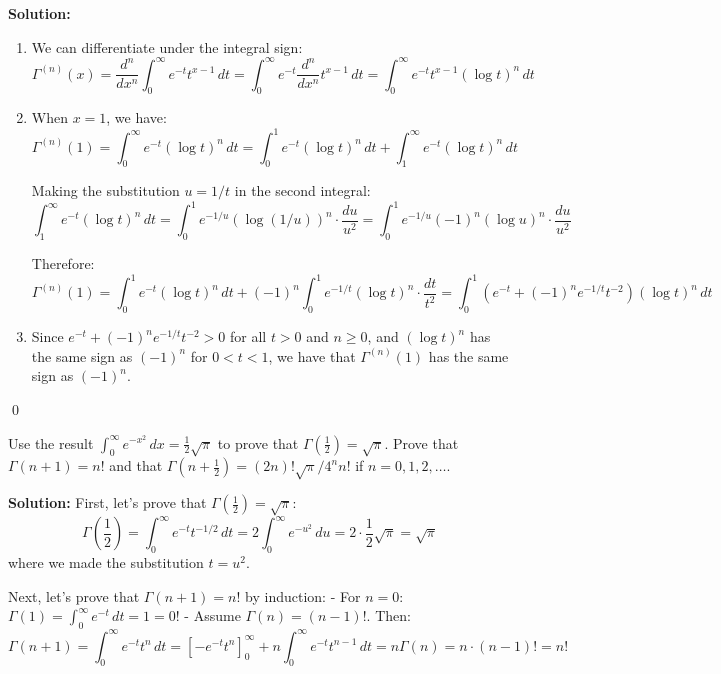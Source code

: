 \bigskip\noindent\textbf{Solution:}
\begin{enumerate}[label=(\alph*)]
    \item We can differentiate under the integral sign:
    \[\Gamma^{(n)}(x) = \frac{d^{n}}{dx^{n}} \int_{0}^{\infty} e^{-t} t^{x-1} \, dt = \int_{0}^{\infty} e^{-t} \frac{d^{n}}{dx^{n}} t^{x-1} \, dt = \int_{0}^{\infty} e^{-t} t^{x-1} (\log t)^{n} \, dt\]
    
    \item When $x = 1$, we have:
    \[\Gamma^{(n)}(1) = \int_{0}^{\infty} e^{-t} (\log t)^{n} \, dt = \int_{0}^{1} e^{-t} (\log t)^{n} \, dt + \int_{1}^{\infty} e^{-t} (\log t)^{n} \, dt\]
    
    Making the substitution $u = 1/t$ in the second integral:
    \[\int_{1}^{\infty} e^{-t} (\log t)^{n} \, dt = \int_{0}^{1} e^{-1/u} (\log(1/u))^{n} \cdot \frac{du}{u^{2}} = \int_{0}^{1} e^{-1/u} (-1)^{n} (\log u)^{n} \cdot \frac{du}{u^{2}}\]
    
    Therefore:
    \[\Gamma^{(n)}(1) = \int_{0}^{1} e^{-t} (\log t)^{n} \, dt + (-1)^{n} \int_{0}^{1} e^{-1/t} (\log t)^{n} \cdot \frac{dt}{t^{2}} = \int_{0}^{1} (e^{-t} + (-1)^{n} e^{-1/t} t^{-2}) (\log t)^{n} \, dt\]
    
    \item Since $e^{-t} + (-1)^{n} e^{-1/t} t^{-2} > 0$ for all $t > 0$ and $n \geq 0$, and $(\log t)^{n}$ has the same sign as $(-1)^{n}$ for $0 < t < 1$, we have that $\Gamma^{(n)}(1)$ has the same sign as $(-1)^{n}$.
\end{enumerate}\qed


\begin{problembox}
Use the result $\int_{0}^{\infty} e^{-x^{2}} \, dx = \frac{1}{2} \sqrt{\pi}$ to prove that $\Gamma(\frac{1}{2}) = \sqrt{\pi}$. Prove that $\Gamma(n + 1) = n!$ and that $\Gamma(n + \frac{1}{2}) = (2n)! \sqrt{\pi}/4^{n}n!$ if $n = 0, 1, 2, \ldots$.
\end{problembox}

\bigskip\noindent\textbf{Solution:}
First, let's prove that $\Gamma(\frac{1}{2}) = \sqrt{\pi}$:
\[\Gamma\left(\frac{1}{2}\right) = \int_{0}^{\infty} e^{-t} t^{-1/2} \, dt = 2 \int_{0}^{\infty} e^{-u^{2}} \, du = 2 \cdot \frac{1}{2} \sqrt{\pi} = \sqrt{\pi}\]
where we made the substitution $t = u^{2}$.

Next, let's prove that $\Gamma(n + 1) = n!$ by induction:
- For $n = 0$: $\Gamma(1) = \int_{0}^{\infty} e^{-t} \, dt = 1 = 0!$
- Assume $\Gamma(n) = (n-1)!$. Then:
\[\Gamma(n + 1) = \int_{0}^{\infty} e^{-t} t^{n} \, dt = \left[-e^{-t} t^{n}\right]_{0}^{\infty} + n \int_{0}^{\infty} e^{-t} t^{n-1} \, dt = n \Gamma(n) = n \cdot (n-1)! = n!\]

